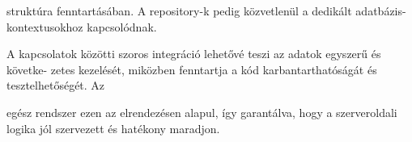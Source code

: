 struktúra fenntartásában. A repository-k pedig közvetlenül a dedikált adatbázis-kontextusokhoz kapcsolódnak.

A kapcsolatok közötti szoros integráció lehetővé teszi az adatok egyszerű és követke-
zetes kezelését, miközben fenntartja a kód karbantarthatóságát és tesztelhetőségét. Az

egész rendszer ezen az elrendezésen alapul, így garantálva, hogy a szerveroldali logika
jól szervezett és hatékony maradjon.

